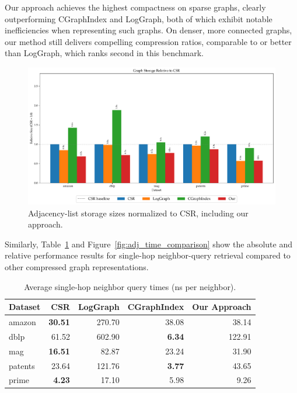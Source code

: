 Our approach achieves the highest compactness on sparse graphs, clearly outperforming CGraphIndex and LogGraph, both of which exhibit notable inefficiencies when representing such graphs. On denser, more connected graphs, our method still delivers compelling compression ratios, comparable to or better than LogGraph, which ranks second in this benchmark.

\begin{figure}[htbp]
  \centering
  \includegraphics[width=\linewidth]{plots/adj_size_comparison.pdf}
  \caption{Adjacency-list storage sizes normalized to CSR, including our approach.}
  \label{fig:adj_size_comparison}
\end{figure}
\FloatBarrier

Similarly, Table~\ref{tab:adj_time_usage_neighbors} and Figure~\ref{fig:adj_time_comparison} show the absolute and relative performance results for single-hop neighbor-query retrieval compared to other compressed graph representations.

\begin{table}[htbp]
\centering
\caption{Average single-hop neighbor query times (ns per neighbor).}
\label{tab:adj_time_usage_neighbors}
\begin{tabular}{lrrrr}
\toprule
Dataset & CSR & LogGraph & CGraphIndex & Our Approach \\
\midrule
amazon  & \textbf{30.51} & 270.70 &  38.08 &  38.14 \\
dblp    &  61.52 & 602.90 &   \textbf{6.34} & 122.91 \\
mag     & \textbf{16.51} &  82.87 &  23.24 &  31.90 \\
patents &  23.64 & 121.76 &   \textbf{3.77} &  43.65 \\
prime   &  \textbf{4.23} &  17.10 &   5.98 &   9.26 \\
\bottomrule
\end{tabular}
\end{table}
\FloatBarrier

